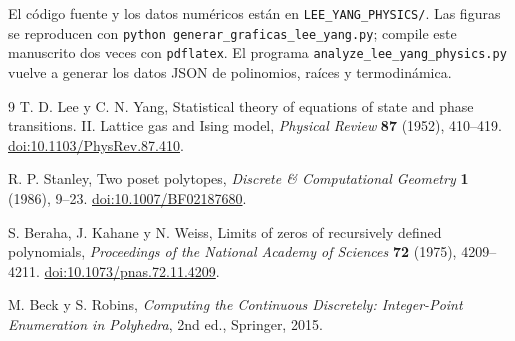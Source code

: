 \documentclass[11pt]{article}
\begin{document}
El código fuente y los datos numéricos están en \texttt{LEE\_YANG\_PHYSICS/}. Las figuras se reproducen con \texttt{python generar\_graficas\_lee\_yang.py}; compile este manuscrito dos veces con \texttt{pdflatex}. El programa \texttt{analyze\_lee\_yang\_physics.py} vuelve a generar los datos JSON de polinomios, raíces y termodinámica.

\begin{thebibliography}{9}
T. D. Lee y C. N. Yang,
Statistical theory of equations of state and phase transitions. II. Lattice gas and Ising model,
\emph{Physical Review} \textbf{87} (1952), 410--419.
\href{https://doi.org/10.1103/PhysRev.87.410}{doi:10.1103/PhysRev.87.410}.

R. P. Stanley,
Two poset polytopes,
\emph{Discrete \& Computational Geometry} \textbf{1} (1986), 9--23.
\href{https://doi.org/10.1007/BF02187680}{doi:10.1007/BF02187680}.

S. Beraha, J. Kahane y N. Weiss,
Limits of zeros of recursively defined polynomials,
\emph{Proceedings of the National Academy of Sciences} \textbf{72} (1975), 4209--4211.
\href{https://doi.org/10.1073/pnas.72.11.4209}{doi:10.1073/pnas.72.11.4209}.

M. Beck y S. Robins,
\emph{Computing the Continuous Discretely: Integer-Point Enumeration in Polyhedra},
2nd ed., Springer, 2015.
\end{thebibliography}
\end{document}
